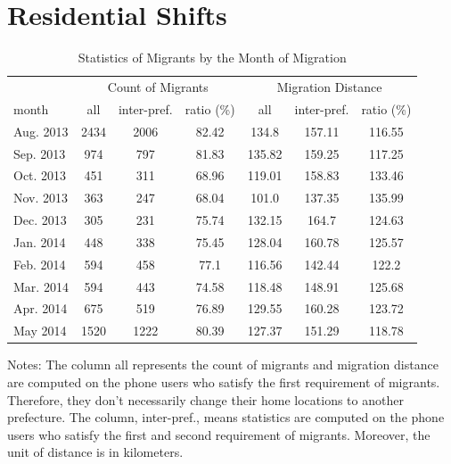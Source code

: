 \section{Residential Shifts}\label{sec:migrant_criterion}
\begin{table}[htbp]
\renewcommand{\arraystretch}{1.5}
\setlength{\tabcolsep}{4mm}{}
\centering
\small
\caption{Statistics of Migrants by the Month of Migration}
\begin{tabular}{lcccccc} \hline
& \multicolumn{3}{c}{Count of Migrants} & \multicolumn{3}{c}{Migration Distance} \\
\cline{2-4} \cline{5-7}
month & all & inter-pref. & ratio (\%) & all & inter-pref. & ratio (\%) \\ \hline
Aug. 2013 & 2434 & 2006 & 82.42 & 134.8 & 157.11 & 116.55 \\
Sep. 2013 & 974 & 797 & 81.83 & 135.82 & 159.25 & 117.25 \\
Oct. 2013 & 451 & 311 & 68.96 & 119.01 & 158.83 & 133.46 \\
Nov. 2013 & 363 & 247 & 68.04 & 101.0 & 137.35 & 135.99 \\
Dec. 2013 & 305 & 231 & 75.74 & 132.15 & 164.7 & 124.63 \\
Jan. 2014 & 448 & 338 & 75.45 & 128.04 & 160.78 & 125.57 \\
Feb. 2014 & 594 & 458 & 77.1 & 116.56 & 142.44 & 122.2 \\
Mar. 2014 & 594 & 443 & 74.58 & 118.48 & 148.91 & 125.68 \\
Apr. 2014 & 675 & 519 & 76.89 & 129.55 & 160.28 & 123.72 \\
May 2014 & 1520 & 1222 & 80.39 & 127.37 & 151.29 & 118.78 \\
\hline

\end{tabular}
\label{tab:migration_sample}%

\end{table}%

\vspace{-2em}
\begin{singlespace}
\begin{footnotesize}
\noindent Notes: The column all represents the count of migrants and migration distance are computed on the phone users who satisfy the first requirement of migrants. Therefore, they don't necessarily change their home locations to another prefecture. The column, inter-pref., means statistics are computed on the phone users who satisfy the first and second requirement of migrants. Moreover, the unit of distance is in kilometers.
\end{footnotesize}
\end{singlespace}

